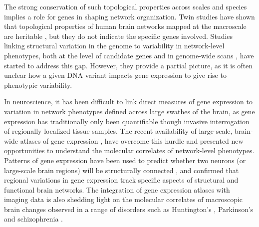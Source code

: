 The strong conservation of such topological properties across scales and species implies a role for genes in shaping network organization. Twin studies have shown that topological properties of human brain networks mapped at the macroscale are heritable \citep{Smit2008,Fornito2011,VandenHeuvel2013e,Bohlken2014,Sinclair2015,Zhan2015,Colclough2017}, but they do not indicate the specific genes involved. Studies linking structural variation in the genome to variability in network-level phenotypes, both at the level of candidate genes \citep{Liu2010,Brown2011,Dennis2011,Markett2017} and in genome-wide scans \citep{Jahanshad2013}, have started to address this gap. However, they provide a partial picture, as it is often unclear how a given DNA variant impacts gene expression to give rise to phenotypic variability.

In neuroscience, it has been difficult to link direct measures of gene expression to variation in network phenotypes defined across large swathes of the brain, as gene expression has traditionally only been quantifiable though invasive interrogation of regionally localized tissue samples.
The recent availability of large-scale, brain-wide atlases of gene expression \citep{Lein2007a,Hawrylycz2012}, have overcome this hurdle and presented new opportunities to understand the molecular correlates of network-level phenotypes. Patterns of gene expression have been used to predict whether two neurons (or large-scale brain regions) will be structurally connected \citep{Varadan2006,Kaufman2006,Baruch2008,Wolf2011,French2011,Ji2014,Fakhry2015a}, and confirmed that regional variations in gene expression track specific aspects of structural \citep{Goel2014,Forest2017,Parkes2017,Romero-Garcia2018} and functional \citep{Cioli2014b,Richiardi2015,Hawrylycz2015,Krienen2016,Anderson2018} brain networks. The integration of gene expression atlases with imaging data is also shedding light on the molecular correlates of macroscopic brain changes observed in a range of disorders such as Huntington’s \citep{McColgan2018}, Parkinson’s \citep{Rittman2016} and schizophrenia \citep{Romme2017}.

